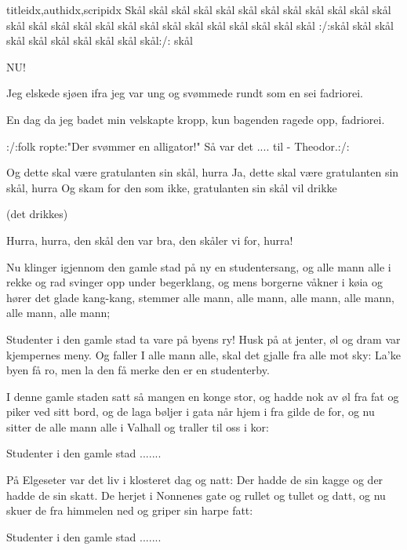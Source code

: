 \documentclass[14pt,letterpaper,norsk]{article}
\begin{document}
\begin{songs}{titleidx,authidx,scripidx}
\beginverse
Skål skål skål skål skål skål skål
skål skål skål skål skål skål
skål skål skål skål skål skål skål
skål skål skål skål skål skål
:/:skål skål skål skål
skål skål skål skål skål skål:/:
skål
\endverse
\endsong

\beginverse
NU!
\endverse
\endsong

\beginverse
Jeg elskede sjøen ifra jeg var ung
og svømmede rundt som en sei
fadriorei.
\endverse

\beginverse
En dag da jeg badet min velskapte kropp,
kun bagenden ragede opp,
fadriorei.
\endverse

\beginverse
:/:folk ropte:"Der svømmer en alligator!"
Så var det .... til - Theodor.:/:
\endverse
\endsong

\beginverse
Og dette skal være gratulanten sin skål, hurra
Ja, dette skal være gratulanten sin skål, hurra
Og skam for den som ikke, gratulanten sin skål vil drikke

(det drikkes)

Hurra, hurra, den skål den var bra, den skåler vi for, hurra!
\endverse
\endsong

\beginverse
Nu klinger igjennom den gamle stad på ny en studentersang,
og alle mann alle i rekke og rad svinger opp under begerklang,
og mens borgerne våkner i køia og hører det glade kang-kang,
stemmer alle mann, alle mann, alle mann, alle mann, alle mann, alle mann;
\endverse

\beginchorus
Studenter i den gamle stad ta vare på byens ry!
Husk på at jenter, øl og dram var kjempernes meny.
Og faller I alle mann alle, skal det gjalle fra alle mot sky:
La'ke byen få ro, men la den få merke den er en studenterby.
\endchorus

\beginverse
I denne gamle staden satt så mangen en konge stor,
og hadde nok av øl fra fat og piker ved sitt bord,
og de laga bøljer i gata når hjem i fra gilde de for,
og nu sitter de alle mann alle i Valhall og traller til oss i kor:
\endverse

\beginchorus
Studenter i den gamle stad .......
\endchorus

\beginverse
På Elgeseter var det liv i klosteret dag og natt:
Der hadde de sin kagge og der hadde de sin skatt.
De herjet i Nonnenes gate og rullet og tullet og datt,
og nu skuer de fra himmelen ned og griper sin harpe fatt:
\endverse

\beginchorus
Studenter i den gamle stad .......
\endchorus


\end{songs}
\end{document}
